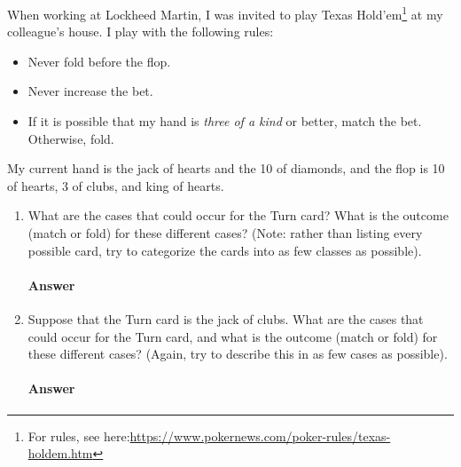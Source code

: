 \documentclass{article}
\begin{document}
\collab{\todo{}}

When working at Lockheed Martin, I was invited to play Texas
Hold'em\footnote{For rules, see
here:\url{https://www.pokernews.com/poker-rules/texas-holdem.htm}} at my
colleague's house.  I play with the following rules:
\begin{itemize}
    \item Never fold before the flop.
    \item Never increase the bet.
    \item If it is possible that my hand is \emph{three of a kind} or better,
        match the bet.  Otherwise, fold.
\end{itemize}
My current hand is the jack of hearts and the 10 of diamonds, and the flop is 10
of hearts, 3 of clubs, and king of hearts.

\begin{enumerate}

    \item What are the cases that could occur for the Turn card?  What is the
        outcome (match or fold) for these different cases? (Note: rather than
        listing every possible card, try to categorize the cards into as few
        classes as possible).

    \paragraph{Answer}

    \item Suppose that the Turn card is the jack of clubs.
        What are the cases that could occur for the Turn card, and what is the
        outcome (match or fold) for these different cases?  (Again, try to
        describe this in as few cases as possible).

    \paragraph{Answer}

\end{enumerate}


\collab{\todo{}}
\end{document}
